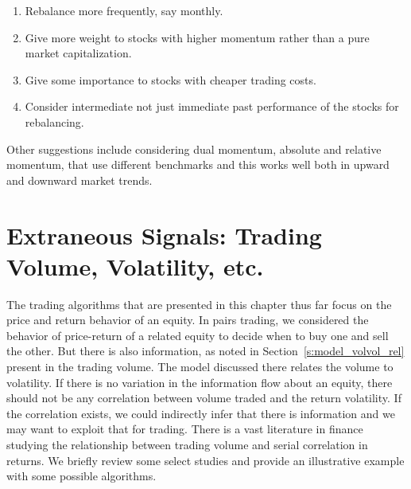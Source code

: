 \begin{enumerate}[--]
\item Rebalance more frequently, say monthly.
\item Give more weight to stocks with higher momentum rather than a pure market capitalization.
\item Give some importance to stocks with cheaper trading costs.
\item Consider intermediate not just immediate past performance of the stocks for rebalancing.
\end{enumerate} 


Other suggestions include considering dual momentum, absolute and relative momentum, that use different benchmarks and this works well both in upward and downward market trends. \label{in:mom3}



\section{Extraneous Signals: Trading Volume, Volatility, etc.}

The trading algorithms that are presented in this chapter thus far focus on the price and return behavior of an equity. In pairs trading, we considered the behavior of price-return of a related equity to decide when to buy one and sell the other. But there is also information, as noted in Section~\ref{s:model_volvol_rel} present in the trading volume. The model discussed there relates the volume to volatility. If there is no variation in the information flow about an equity, there should not be any correlation between volume traded and the return volatility. If the correlation exists, we could indirectly infer that there is information and we may want to exploit that for trading. There is a vast literature in finance studying the relationship between trading volume and serial correlation in returns. We briefly review some select studies and provide an illustrative example with some possible algorithms. 


